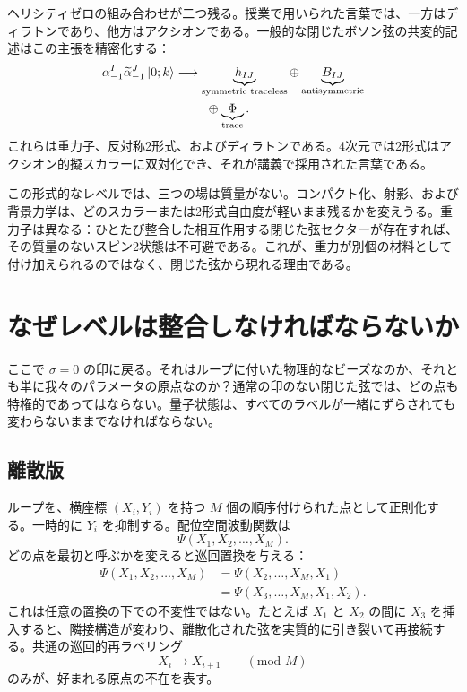 ヘリシティゼロの組み合わせが二つ残る。授業で用いられた言葉では、一方はディラトンであり、他方はアクシオンである。一般的な閉じたボソン弦の共変的記述はこの主張を精密化する：
\begin{equation}
  \begin{aligned}
    \alpha_{-1}^{I}\widetilde\alpha_{-1}^{J}\left\lvert0;k\right\rangle
    &\longrightarrow
    \underbrace{h_{IJ}}_{\text{symmetric traceless}}
    \oplus
    \underbrace{B_{IJ}}_{\text{antisymmetric}}\\
    &\hspace{2.5em}\oplus
    \underbrace{\Phi}_{\text{trace}}.
  \end{aligned}
  \label{eq:l04-massless-tensor-decomposition}
\end{equation}
これらは重力子、反対称2形式、およびディラトンである。4次元では2形式はアクシオン的擬スカラーに双対化でき、それが講義で採用された言葉である。

この形式的なレベルでは、三つの場は質量がない。コンパクト化、射影、および背景力学は、どのスカラーまたは2形式自由度が軽いまま残るかを変えうる。重力子は異なる：ひとたび整合した相互作用する閉じた弦セクターが存在すれば、その質量のないスピン2状態は不可避である。これが、重力が別個の材料として付け加えられるのではなく、閉じた弦から現れる理由である。

\section{なぜレベルは整合しなければならないか}

ここで \(\sigma=0\) の印に戻る。それはループに付いた物理的なビーズなのか、それとも単に我々のパラメータの原点なのか？通常の印のない閉じた弦では、どの点も特権的であってはならない。量子状態は、すべてのラベルが一緒にずらされても変わらないままでなければならない。

\subsection{離散版}

ループを、横座標 \((X_i,Y_i)\) を持つ \(M\) 個の順序付けられた点として正則化する。一時的に \(Y_i\) を抑制する。配位空間波動関数は
\begin{equation}
  \Psi(X_1,X_2,\ldots,X_M).
\end{equation}
どの点を最初と呼ぶかを変えると巡回置換を与える：
\begin{align}
  \Psi(X_1,X_2,\ldots,X_M)
  &=
  \Psi(X_2,\ldots,X_M,X_1)\nonumber\\
  &=
  \Psi(X_3,\ldots,X_M,X_1,X_2).
  \label{eq:l04-cyclic-wavefunction}
\end{align}
これは任意の置換の下での不変性ではない。たとえば \(X_1\) と \(X_2\) の間に \(X_3\) を挿入すると、隣接構造が変わり、離散化された弦を実質的に引き裂いて再接続する。共通の巡回的再ラベリング
\begin{equation}
  X_i\longrightarrow X_{i+1}\qquad(\text{mod }M)
  \label{eq:l04-discrete-shift}
\end{equation}
のみが、好まれる原点の不在を表す。

